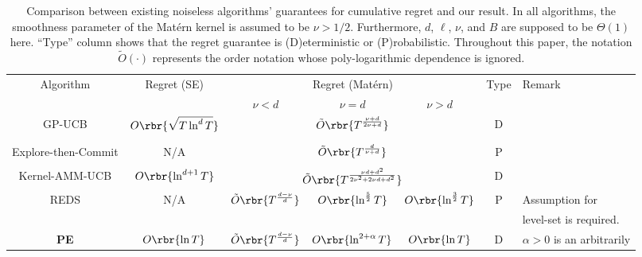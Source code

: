 \begin{table*}[tb]
    \centering
    \caption{Comparison between existing noiseless algorithms' guarantees for cumulative regret and our result. 
    In all algorithms, the smoothness parameter of the Mat\'ern kernel is assumed to be $\nu > 1/2$.
    Furthermore, $d$, $\ell$, $\nu$, and $B$ are supposed to be $\Theta(1)$ here. ``Type'' column shows that the regret guarantee is  (D)eterministic or (P)robabilistic. Throughout this paper, the notation $\tilde{O}(\cdot)$ represents the order notation whose poly-logarithmic dependence is ignored.
    }
    \begin{tabular}{c|c|c|c|c|c|l}
    \multicolumn{1}{c|}{\multirow{2}{*}{Algorithm}} & \multicolumn{1}{|c|}{\multirow{2}{*}{Regret (SE)}} & \multicolumn{3}{|c|}{Regret (Mat\'ern)} & \multirow{2}{*}{Type} & \multirow{2}{*}{Remark} \\ \cline{3-5}
    \multicolumn{1}{c|}{}  & \multicolumn{1}{|c|}{}  & $\nu < d$  & $\nu = d$  & $\nu > d$ &  & \\ \hline \hline
     GP-UCB & \multirow{3}{*}{$O\rbr{\sqrt{T \ln^{d} T}}$} & \multicolumn{3}{|c|}{\multirow{3}{*}{$\tilde{O}\rbr{T^{\frac{\nu + d}{2\nu + d}}}$}} & \multirow{3}{*}{D} & \\ 
     \cite{lyu2019efficient} & & \multicolumn{3}{|c|}{} & & \\ 
     \cite{kim2024bayesian} & & \multicolumn{3}{|c|}{} & & \\ \hline
     Explore-then-Commit & \multirow{2}{*}{N/A} & \multicolumn{3}{|c|}{\multirow{2}{*}{$\tilde{O}\rbr{T^{\frac{d}{\nu + d}}}$}} & \multirow{2}{*}{P} & \\ 
     \cite{vakili2022open} &  & \multicolumn{3}{|c|}{} & & \\ \hline
         Kernel-AMM-UCB
      & \multirow{2}{*}{$O\rbr{\ln^{d+1} T}$} & \multicolumn{3}{|c|}{\multirow{2}{*}{$\tilde{O}\rbr{T^{\frac{\nu d + d^2}{2\nu^2 + 2\nu d + d^2}}}$}} & \multirow{2}{*}{D} & \\ 
      \cite{flynn2024tighter}
      &  & \multicolumn{3}{|c|}{} & & \\ \hline
     REDS & \multirow{2}{*}{N/A} & \multirow{2}{*}{$\tilde{O}\rbr{T^{\frac{d - \nu}{d}}}$} & \multirow{2}{*}{$O\rbr{\ln^{\frac{5}{2}} T}$} & \multirow{2}{*}{$O\rbr{\ln^{\frac{3}{2}} T}$} & \multirow{2}{*}{P} & Assumption for \\
     \cite{salgiarandom} &  &  &  &  & & level-set is required. \\ \hline
     \textbf{PE} & \multirow{2}{*}{$O\rbr{\ln T}$} & \multirow{2}{*}{$\tilde{O}\rbr{T^{\frac{d - \nu}{d}}}$} & \multirow{2}{*}{$O\rbr{\ln^{2 +\alpha} T}$} & \multirow{2}{*}{$O\rbr{\ln T}$} & \multirow{2}{*}{D} & $\alpha > 0$ is an arbitrarily  \\ 

\end{tabular}
\end{table*}
